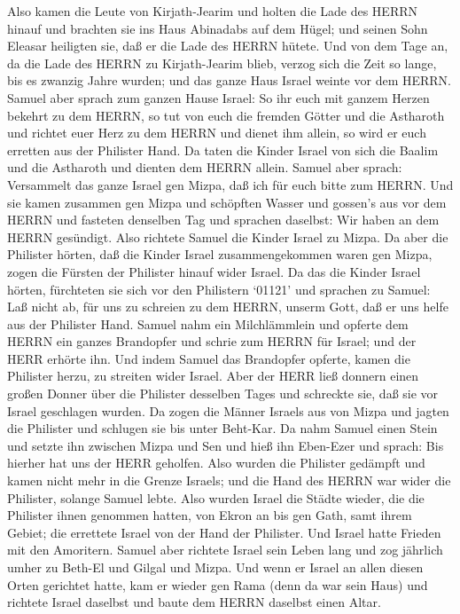  Also kamen die Leute von Kirjath-Jearim und holten die Lade
des HERRN hinauf und brachten sie ins Haus Abinadabs auf dem Hügel; und
seinen Sohn Eleasar heiligten sie, daß er die Lade des HERRN hütete.
 Und von dem Tage an, da die Lade des HERRN zu
Kirjath-Jearim blieb, verzog sich die Zeit so lange, bis es zwanzig
Jahre wurden; und das ganze Haus Israel weinte vor dem HERRN.
 Samuel aber sprach zum ganzen Hause Israel: So ihr euch mit
ganzem Herzen bekehrt zu dem HERRN, so tut von euch die fremden Götter
und die Astharoth und richtet euer Herz zu dem HERRN und dienet ihm
allein, so wird er euch erretten aus der Philister Hand.  Da
taten die Kinder Israel von sich die Baalim und die Astharoth und
dienten dem HERRN allein.  Samuel aber sprach: Versammelt
das ganze Israel gen Mizpa, daß ich für euch bitte zum HERRN.
 Und sie kamen zusammen gen Mizpa und schöpften Wasser und
gossen's aus vor dem HERRN und fasteten denselben Tag und sprachen
daselbst: Wir haben an dem HERRN gesündigt. Also richtete Samuel die
Kinder Israel zu Mizpa.  Da aber die Philister hörten, daß
die Kinder Israel zusammengekommen waren gen Mizpa, zogen die Fürsten
der Philister hinauf wider Israel. Da das die Kinder Israel hörten,
fürchteten sie sich vor den Philistern  `01121' und sprachen
zu Samuel: Laß nicht ab, für uns zu schreien zu dem HERRN, unserm Gott,
daß er uns helfe aus der Philister Hand.  Samuel nahm ein
Milchlämmlein und opferte dem HERRN ein ganzes Brandopfer und schrie zum
HERRN für Israel; und der HERR erhörte ihn.  Und indem
Samuel das Brandopfer opferte, kamen die Philister herzu, zu streiten
wider Israel. Aber der HERR ließ donnern einen großen Donner über die
Philister desselben Tages und schreckte sie, daß sie vor Israel
geschlagen wurden.  Da zogen die Männer Israels aus von
Mizpa und jagten die Philister und schlugen sie bis unter Beht-Kar.
 Da nahm Samuel einen Stein und setzte ihn zwischen Mizpa
und Sen und hieß ihn Eben-Ezer und sprach: Bis hierher hat uns der HERR
geholfen.  Also wurden die Philister gedämpft und kamen
nicht mehr in die Grenze Israels; und die Hand des HERRN war wider die
Philister, solange Samuel lebte.  Also wurden Israel die
Städte wieder, die die Philister ihnen genommen hatten, von Ekron an bis
gen Gath, samt ihrem Gebiet; die errettete Israel von der Hand der
Philister. Und Israel hatte Frieden mit den Amoritern. 
Samuel aber richtete Israel sein Leben lang  und zog
jährlich umher zu Beth-El und Gilgal und Mizpa. Und wenn er Israel an
allen diesen Orten gerichtet hatte,  kam er wieder gen Rama
(denn da war sein Haus) und richtete Israel daselbst und baute dem HERRN
daselbst einen Altar.


